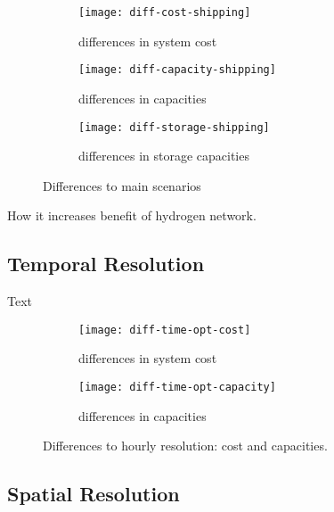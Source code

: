 \begin{figure}
    \centering
    \begin{subfigure}[t]{\textwidth}
        \centering
        \caption{differences in system cost}
        \texttt{[image: diff-cost-shipping]}
        \label{fig:sensitivity-shipping-cost}
    \end{subfigure}
    \begin{subfigure}[t]{\textwidth}
        \centering
        \caption{differences in capacities}
        \texttt{[image: diff-capacity-shipping]}
        \label{fig:sensitivity-shipping-cap}
    \end{subfigure}
    \begin{subfigure}[t]{\textwidth}
        \centering
        \caption{differences in storage capacities}
        \texttt{[image: diff-storage-shipping]}
        \label{fig:sensitivity-shipping-sto}
    \end{subfigure}
    \caption{Differences to main scenarios}
    \label{fig:sensitivity-shipping-diff}
\end{figure}


How it increases benefit of hydrogen network.

\subsection{Temporal Resolution}
\label{sec:si:sensitivity-time}

Text

\begin{figure}
    \centering
    \begin{subfigure}[t]{\textwidth}
        \centering
        \caption{differences in system cost}
        \texttt{[image: diff-time-opt-cost]}
        \label{fig:sensitivity-time-cost}
    \end{subfigure}
    \begin{subfigure}[t]{\textwidth}
        \centering
        \caption{differences in capacities}
        \texttt{[image: diff-time-opt-capacity]}
        \label{fig:sensitivity-time-cap}
    \end{subfigure}
    \caption{Differences to hourly resolution: cost and capacities.}
    \label{fig:sensitivity-time}
\end{figure}

\subsection{Spatial Resolution}
\label{sec:si:sensitivity-space}

